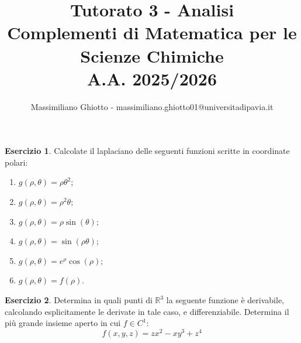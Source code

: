 \documentclass[12pt,a4paper]{article}
\title{Tutorato 3 - Analisi\\Complementi di Matematica per le Scienze Chimiche\\ A.A. 2025/2026}
\author{Massimiliano Ghiotto - massimiliano.ghiotto01@universitadipavia.it}
\date{}
\theoremstyle{definition}
\newtheorem{exe}{Esercizio}
\begin{document}
\maketitle





\begin{exe}
    Calcolate il laplaciano delle seguenti funzioni scritte in coordinate polari:
    \begin{enumerate}
        \item $g(\rho, \theta) = \rho \theta^2$;
        \item $g(\rho, \theta) = \rho^2 \theta$;
        \item $g(\rho, \theta) = \rho \sin(\theta)$;
        \item $g(\rho, \theta) = \sin(\rho \theta)$;
        \item $g(\rho, \theta) = e^\rho \cos(\rho)$;
        \item $g(\rho, \theta) = f(\rho)$.
    \end{enumerate}
\end{exe}

\begin{exe}
    Determina in quali punti di $\mathbb{R}^3$ la seguente funzione è derivabile, calcolando esplicitamente le derivate in tale caso, e differenziabile. Determina il più grande insieme aperto in cui $f \in C^1$:
    \[
        f(x,y,z) = zx^2 - xy^3 + z^4
    \]
\end{exe}
\end{document}
